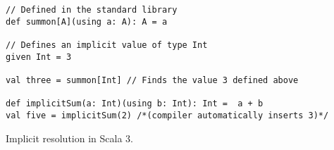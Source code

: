 \begin{algorithm}
\begin{verbatim}
// Defined in the standard library
def summon[A](using a: A): A = a

// Defines an implicit value of type Int
given Int = 3

val three = summon[Int] // Finds the value 3 defined above

def implicitSum(a: Int)(using b: Int): Int =  a + b
val five = implicitSum(2) /*(compiler automatically inserts 3)*/
\end{verbatim}

\caption{Implicit resolution in Scala 3. \label{scala:implicits}}
\end{algorithm}